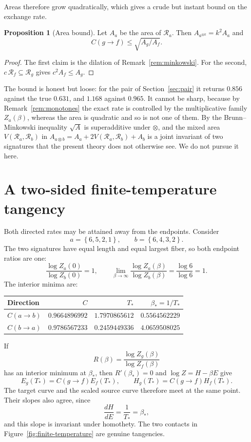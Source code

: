 \documentclass[11pt]{article}
\theoremstyle{definition}
\newtheorem{proposition}{Proposition}
\theoremstyle{remark}
\newcommand{\sig}[1]{\left\{#1\right\}}
\begin{document}
Areas therefore grow quadratically, which gives a crude but instant bound on
the exchange rate.

\begin{proposition}[Area bound]
\label{prop:area}
Let \(A_a\) be the area of \(\mathcal R_a\).  Then
\(A_{a^{\otimes k}}=k^2A_a\) and
\[
  C(g\to f)\leq\sqrt{A_g/A_f}.
\]
\end{proposition}

\begin{proof}
The first claim is the dilation of Remark~\ref{rem:minkowski}.  For the second, \(c\,\mathcal
R_f\subseteq\mathcal R_g\) gives \(c^2A_f\leq A_g\).
\end{proof}

The bound is honest but loose: for the pair of Section~\ref{sec:pair} it
returns \(0.856\) against the true \(0.631\), and \(1.168\) against
\(0.965\).  It cannot be sharp, because by Remark~\ref{rem:monotones} the
exact rate is controlled by the multiplicative family \(Z_a(\beta)\), whereas
the area is quadratic and so is not one of them.  By the Brunn--Minkowski
inequality \(\sqrt{A}\) is superadditive under \(\otimes\), and the mixed area
\(V(\mathcal R_a,\mathcal R_b)\) in
\(A_{a\otimes b}=A_a+2V(\mathcal R_a,\mathcal R_b)+A_b\) is a joint invariant
of two signatures that the present theory does not otherwise see.  We do not
pursue it here.

\section{A two-sided finite-temperature tangency}
\label{sec:tangency}

Both directed rates may be attained away from the endpoints.  Consider
\[
  a=\sig{6,5,2,1},
  \qquad
  b=\sig{6,4,3,2}.
\]
The two signatures have equal length and equal largest fiber, so both
endpoint ratios are one:
\[
 \frac{\log Z_a(0)}{\log Z_b(0)}=1,
 \qquad
 \lim_{\beta\to\infty}
 \frac{\log Z_a(\beta)}{\log Z_b(\beta)}
 =\frac{\log6}{\log6}=1.
\]
The interior minima are:
\begin{center}
\begin{tabular}{@{}lrrr@{}}
\toprule
Direction & \(C\) & \(T_*\) & \(\beta_*=1/T_*\) \\
\midrule
\(C(a\to b)\) &
\(0.9664896992\) & \(1.7970865612\) & \(0.5564562229\) \\
\(C(b\to a)\) &
\(0.9786567233\) & \(0.2459449336\) & \(4.0659508025\) \\
\bottomrule
\end{tabular}
\end{center}
If
\[
  R(\beta)=\frac{\log Z_g(\beta)}{\log Z_f(\beta)}
\]
has an interior minimum at \(\beta_*\), then \(R'(\beta_*)=0\) and
\(\log Z=H-\beta E\) give
\[
  E_g(T_*)=C(g\to f)E_f(T_*),
  \qquad
  H_g(T_*)=C(g\to f)H_f(T_*).
\]
The target curve and the scaled source curve therefore meet at the same
point.  Their slopes also agree, since
\[
  \frac{dH}{dE}=\frac{1}{T_*}=\beta_*,
\]
and this slope is invariant under homothety.  The two contacts in
Figure~\ref{fig:finite-temperature} are genuine tangencies.
\end{document}
